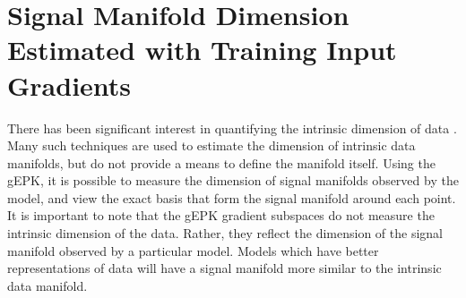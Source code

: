 \section{Signal Manifold Dimension Estimated with Training Input Gradients}



There has been significant interest in quantifying the intrinsic dimension of data \citet{Levina_Bickel_2004,  talwalker2008, ceruti2012, gong2019, Zheng_He_Qiu_Wipf_2022}.
Many such techniques are used to estimate the dimension of intrinsic data manifolds, but do not provide a means to define the manifold itself.
Using the gEPK, it is possible to measure the dimension of signal manifolds observed by the model, and view the exact basis that form the signal manifold around each point.
It is important to note that the gEPK gradient subspaces do not measure the intrinsic dimension of the data. 
Rather, they reflect the dimension of the signal manifold observed by a particular model.
Models which have better representations of data will have a signal manifold more similar to the intrinsic data manifold.



